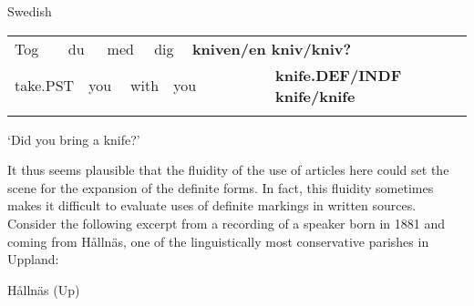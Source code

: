 \begin{listWWNumileveli}
\item 

\begin{styleExample}
Swedish

\end{styleExample}

\end{listWWNumileveli}

\begin{tabular}{llllllllll}
\lsptoprule
Tog & \multicolumn{2}{l}{du

} & \multicolumn{2}{l}{med

} & \multicolumn{2}{l}{dig

} & \multicolumn{2}{l}{{\bfseries kniven/en kniv/kniv?}

} & \\
\multicolumn{2}{l}{take.PST

} & \multicolumn{2}{l}{you

} & \multicolumn{2}{l}{with

} & \multicolumn{2}{l}{you

} & \multicolumn{2}{l}{{\bfseries knife.DEF/INDF knife/knife}

}\\
\lspbottomrule
\end{tabular}

\begin{styleTranslation}
‘Did you bring a knife?’

\end{styleTranslation}

\begin{styleBodyTextFirst}
It thus seems plausible that the fluidity of the use of articles here could set the scene for the expansion of the definite forms. In fact, this fluidity sometimes makes it difficult to evaluate uses of definite markings in written sources. Consider the following excerpt from a recording of a speaker born in 1881 and coming from Hållnäs, one of the linguistically most conservative parishes in Uppland:

\end{styleBodyTextFirst}

\begin{listWWNumileveli}
\item 

\begin{styleExample}
\label{bkm:Ref123725093}Hållnäs (Up)

\end{styleExample}

\end{listWWNumileveli}

